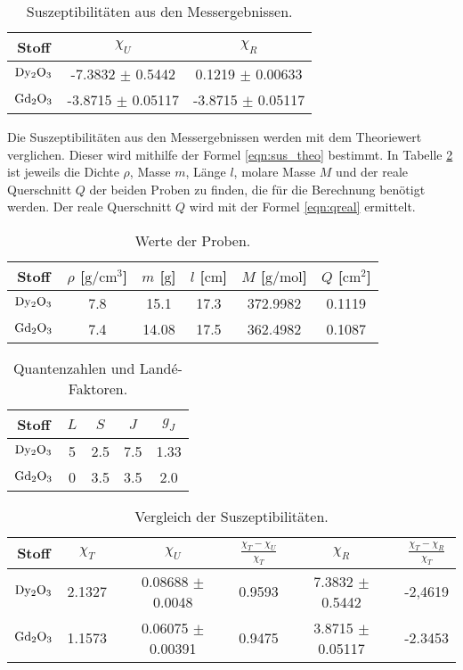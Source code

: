 \begin{table}
  \centering
  \caption{Suszeptibilitäten aus den Messergebnissen.}
  \label{tab:Suszeptibilität_Praxis}
  \begin{tabular}{c c c}
    \toprule
    {Stoff} & {$\chi_U$} & {$\chi_R$} \\
    \midrule
    $\ce{Dy2O3}$ & -7.3832 $\pm$ 0.5442 & 0.1219 $\pm$ 0.00633 \\
    $\ce{Gd2O3}$ & -3.8715 $\pm$ 0.05117 & -3.8715 $\pm$ 0.05117 \\
    \bottomrule
  \end{tabular}
\end{table}

Die Suszeptibilitäten aus den Messergebnissen werden mit dem Theoriewert verglichen.
Dieser wird mithilfe der Formel \eqref{eqn:sus_theo} bestimmt.
In Tabelle \ref{tab:Proben} ist jeweils die Dichte $\rho$, Masse $m$, Länge $l$, molare Masse $M$ und der reale Querschnitt $Q$ der beiden Proben zu finden, die für die Berechnung benötigt werden.
Der reale Querschnitt $Q$ wird mit der Formel \eqref{eqn:qreal} ermittelt.

\begin{table}
  \centering
  \caption{Werte der Proben.}
  \label{tab:Proben}
  \begin{tabular}{c c c c c c }
    \toprule
    {Stoff} & {$\rho$ [$\si{\gram\per\centi\metre\cubed}$]} & {$m$ [$\si{\gram}$]} & {$l$ [$\si{\centi\metre}$]} & {$M$ [$\si{\gram\per\mole}$]} & {$Q$ [$\si{\centi\metre\squared}$]}\\
    \midrule
    $\ce{Dy2O3}$ & 7.8 & 15.1 & 17.3 & 372.9982 & 0.1119\\
    $\ce{Gd2O3}$ & 7.4 & 14.08 & 17.5 & 362.4982 & 0.1087\\
    \bottomrule
  \end{tabular}
\end{table}

\begin{table}
  \centering
  \caption{Quantenzahlen und Landé-Faktoren.}
  \begin{tabular}{c c c c c }
    \toprule
    {Stoff} & {$L$} & {$S$} & {$J$} & {$g_J$}\\
    \midrule
    $\ce{Dy2O3}$ & 5 & 2.5 & 7.5 & 1.33\\
    $\ce{Gd2O3}$ & 0 & 3.5 & 3.5 & 2.0\\
    \bottomrule
  \end{tabular}
\end{table}

\begin{table}
  \centering
  \caption{Vergleich der Suszeptibilitäten.}
  \begin{tabular}{c c c c c c}
    \toprule
    {Stoff} & {$\chi_T$} &{$\chi_U$} & {$\frac{\chi_T - \chi_U}{\chi_T}$} & {$\chi_R$} & {$\frac{\chi_T - \chi_R}{\chi_T}$}\\
    \midrule
    $\ce{Dy2O3}$ & 2.1327 & 0.08688 $\pm$ 0.0048 & 0.9593 & 7.3832 $\pm$ 0.5442&  -2,4619\\
    $\ce{Gd2O3}$ & 1.1573 &  0.06075 $\pm$  0.00391 & 0.9475 &3.8715 $\pm$ 0.05117 & -2.3453 \\
    \bottomrule
  \end{tabular}
\end{table}